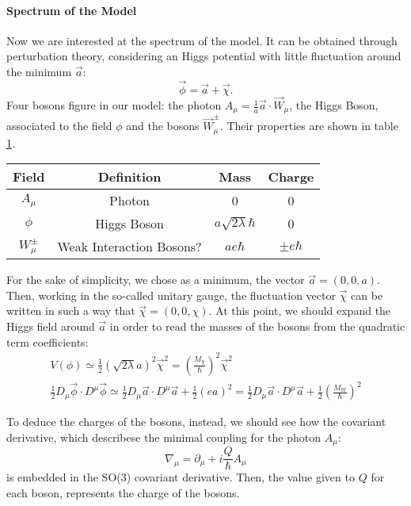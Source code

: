 \paragraph{Spectrum of the Model}
Now we are interested at the spectrum of the model. It can be obtained through perturbation theory, considering an Higgs potential with little fluctuation around the minimum $\vec{a}$:
\begin{equation}
\vec{\phi} = \vec{a}+ \vec{\chi}. 
\end{equation} 
Four bosons figure in our model: the photon $A_{\mu} = \frac{1}{a} \vec{a}\cdot \vec{W}_\mu $, the Higgs Boson, associated to the field $\phi$ and the bosons $\vec{W}_\mu^\pm$. Their properties are shown in table \ref{tab:Bosons}.
\begin{table}[H]
\centering
\begin{tabular}{cc|cc}
\toprule
 Field  &   Definition   &  Mass  &  Charge \\
 \midrule
 $A_{\mu}$ &          Photon                   &  0                             &     0 \\
 $\phi $   &          Higgs Boson              &  $a \sqrt{2 \lambda} \hbar $   &     0 \\
$ W_{\mu}^{\pm} $&    Weak Interaction Bosons? &  $ae\hbar$                     &    $ \pm e \hbar$ \\
 \bottomrule
\end{tabular}
\label{tab:Bosons}
\end{table}


For the sake of simplicity, we chose as a minimum, the vector $\vec{a}= (0,0,a)$. Then, working in the so-called unitary gauge, the fluctuation vector $\vec{\chi}$ can be written in such a way that $\vec{\chi} = (0,0,\chi) $.
At this point, we should expand the Higgs field around $\vec{a}$ in order to read the masses of the bosons from the quadratic term coefficients:
\begin{gather}
V(\phi)\simeq  \frac{1}{2}  \left(\sqrt{2 \lambda} a\right)^2 \vec{\chi}^2 = \left( \frac{M_\chi}{\hbar }\right)^2 \vec{\chi}^2 \\
 \frac{1}{2}D_{\mu}\vec{\phi} \cdot  D^\mu \vec{\phi} \simeq  \frac{1}{2}D_{\mu}\vec{a} \cdot  D^\mu \vec{a}  + \frac{1}{2} \left( ea \right)^2 =\frac{1}{2}D_{\mu}\vec{a} \cdot  D^\mu \vec{a}  + \frac{1}{2} \left( \frac{M_W}{\hbar} \right)^2
\end{gather}

To deduce the charges of the bosons, instead, we should see how the covariant derivative, which describese the minimal coupling for the photon $A_{\mu}$: 
\begin{equation}
\nabla_\mu = \partial_\mu + i \frac{Q}{\hbar} A_{\mu}
\end{equation}
is embedded in the SO(3) covariant derivative. Then, the value given to $Q$ for each boson, represents the charge of the bosons. 

